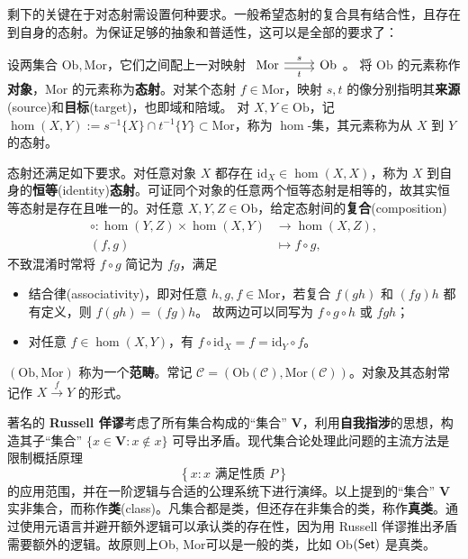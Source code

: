 剩下的关键在于对态射需设置何种要求。一般希望态射的复合具有结合性，且存在到自身的态射。为保证足够的抽象和普适性，这可以是全部的要求了：
\begin{definition}
    设两集合 $\mathrm{Ob},\mathrm{Mor}$，它们之间配上一对映射
     $\begin{tikzcd} \mathrm{Mor} \arrow[yshift=-0.5ex, r, "t"'] \arrow[yshift=0.5ex, r, "s"] & \mathrm{Ob} \end{tikzcd}$。
    将 $\mathrm{Ob}$ 的元素称作\textbf{对象}，$\mathrm{Mor}$ 的元素称为\textbf{态射}。对某个态射 $f\in\mathrm{Mor}$，映射 $s,t$ 的像分别指明其\textbf{来源}(source)和\textbf{目标}(target)，也即域和陪域。
    对 $X, Y \in \mathrm{Ob}$，记 $\hom(X, Y) := s^{-1}\{X\} \cap t^{-1}\{Y\}\subset\mathrm{Mor}$，称为 $\hom$-集，其元素称为从 $X$ 到 $Y$ 的态射。
    
    态射还满足如下要求。对任意对象 $X$ 都存在 $\mathrm{id}_X \in \hom(X, X)$，称为 $X$ 到自身的\textbf{恒等}(identity)\textbf{态射}。可证同个对象的任意两个恒等态射是相等的，故其实恒等态射是存在且唯一的。对任意 $X, Y, Z \in \mathrm{Ob}$，给定态射间的\textbf{复合}(composition)
        \begin{align*}
            \circ : \hom(Y, Z) \times \hom(X, Y) & \longrightarrow \hom(X, Z), \\
            (f, g) & \longmapsto f \circ g,
        \end{align*}
        不致混淆时常将 $f \circ g$ 简记为 $fg$，满足
        \begin{itemize}
            \item 结合律(associativity)，即对任意 $h, g, f \in \mathrm{Mor}$，若复合 $f(gh)$ 和 $(fg)h$ 都有定义，则 $f (g h) = (f g) h$。
            故两边可以同写为 $f \circ g \circ h$ 或 $fgh$；
            \item 对任意 $f \in \hom(X,Y)$，有 $f \circ \mathrm{id}_X = f = \mathrm{id}_Y \circ f$。
        \end{itemize}
    $(\mathrm{Ob},\mathrm{Mor})$ 称为一个\textbf{范畴}。常记 $\mathcal C=(\mathrm{Ob}(\mathcal C),\mathrm{Mor}(\mathcal C))$。对象及其态射常记作 $X\xrightarrow{f} Y$ 的形式。
\end{definition}

著名的 \textbf{Russell 佯谬}考虑了所有集合构成的“集合” $\textbf{V}$，利用\textbf{自我指涉}的思想，构造其子“集合” $\{x \in \textbf{V} : x \notin x\}$ 可导出矛盾。现代集合论处理此问题的主流方法是限制概括原理
\[\left\{x : x \text{ 满足性质 } P\right\}\]
的应用范围，并在一阶逻辑与合适的公理系统下进行演绎。以上提到的“集合” $\textbf{V}$ 实非集合，而称作\textbf{类}(class)。凡集合都是类，但还存在非集合的类，称作\textbf{真类}。通过使用元语言并避开额外逻辑可以承认类的存在性，因为用 Russell 佯谬推出矛盾需要额外的逻辑。故原则上Ob, Mor可以是一般的类，比如 Ob$(\mathsf{Set})$ 是真类。


